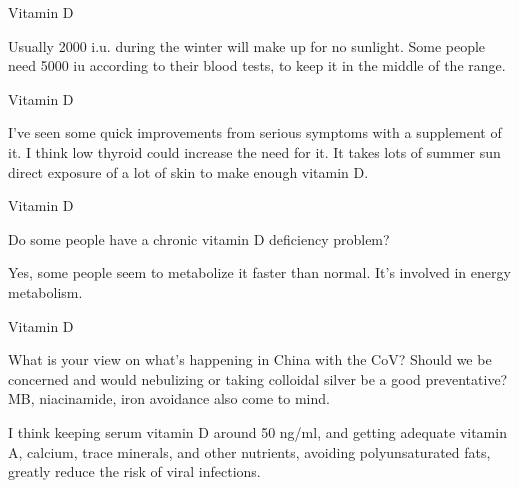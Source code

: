 \documentclass[11pt,oneside,openany,extrafontsizes]{memoir}
\begin{document}
\begin{standalonequote}{Vitamin D}

    \begin{answer}
        Usually 2000 i.u. during the winter will make up for no sunlight. Some people need 5000 iu according to their blood tests, to keep it in the middle of the range.
    \end{answer}
\end{standalonequote}

\begin{standalonequote}{Vitamin D}

    \begin{answer}
        I've seen some quick improvements from serious symptoms with a supplement of it. I think low thyroid could increase the need for it. It takes lots of summer sun direct exposure of a lot of skin to make enough vitamin D.
    \end{answer}
\end{standalonequote}

\begin{qaexchange}{Vitamin D}

    \begin{question}
        Do some people have a chronic vitamin D deficiency problem?
    \end{question}

    \begin{answer}
        Yes, some people seem to metabolize it faster than normal. It's involved in energy metabolism.
    \end{answer}
\end{qaexchange}

\begin{qaexchange}{Vitamin D}

    \begin{question}
        What is your view on what's happening in China with the CoV? Should we be concerned and would nebulizing or taking colloidal silver be a good preventative? MB, niacinamide, iron avoidance also come to mind.
    \end{question}

    \begin{answer}
        I think keeping serum vitamin D around 50 ng/ml, and getting adequate vitamin A, calcium, trace minerals, and other nutrients, avoiding polyunsaturated fats, greatly reduce the risk of viral infections.
    \end{answer}
\end{qaexchange}
\end{document}
